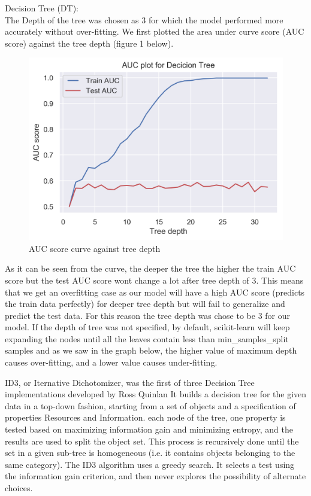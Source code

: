 Decision Tree (DT):\\ The Depth of the tree was chosen as 3 for which the model performed more accurately without over-fitting. We first plotted the area under curve score (AUC score) against the tree depth (figure 1 below).
\begin{figure}[!ht]
 \centering
\includegraphics[width=6.1in]{assignment2/1-3-DecisionTree_AUC.png}
\caption{\label{fig:fig1}AUC score curve against tree depth}
\end{figure}
As it can be seen from the curve, the deeper the tree the higher the train AUC score but the test AUC score wont change a lot after tree depth of 3. This means that we get an overfitting case as our model will have a high AUC score (predicts the train data perfectly) for deeper tree depth but will fail to generalize and predict the test data. For this reason the tree depth was chose to be 3 for our model.
If the depth of tree was not specified, by default, scikit-learn will keep expanding the nodes until all the leaves contain less than min\_samples\_split samples and as we saw in the graph below, the higher value of maximum depth causes over-fitting, and a lower value causes under-fitting\cite{ref_url1}.


ID3, or Iternative Dichotomizer, was the first of three Decision Tree implementations developed by Ross Quinlan
It builds a decision tree for the given data in a top-down fashion, starting from a set of objects and a specification of properties Resources and Information. each node of the tree, one property is tested based on maximizing information gain and minimizing entropy, and the results are used to split the object set. This process is recursively done until the set in a given sub-tree is homogeneous (i.e. it contains objects belonging to the same category). The ID3 algorithm uses a greedy search. It selects a test using the information gain criterion, and then never explores the possibility of alternate choices.

